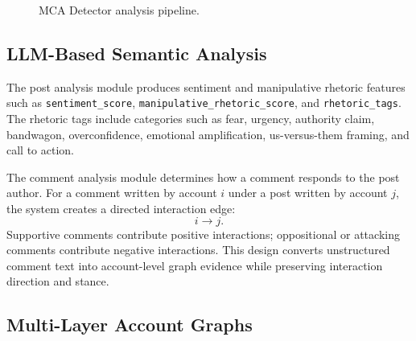 \documentclass[conference]{IEEEtran}
\begin{document}
\begin{figure}[htbp]
\centering
{}
\caption{MCA Detector analysis pipeline.}
\label{fig:pipeline}
\end{figure}

\subsection{LLM-Based Semantic Analysis}

The post analysis module produces sentiment and manipulative rhetoric features
such as \texttt{sentiment\_score}, \texttt{manipulative\_rhetoric\_score}, and
\texttt{rhetoric\_tags}. The rhetoric tags include categories such as fear,
urgency, authority claim, bandwagon, overconfidence, emotional amplification,
us-versus-them framing, and call to action.

The comment analysis module determines how a comment responds to the post
author. For a comment written by account $i$ under a post written by account
$j$, the system creates a directed interaction edge:
\begin{equation}
i \rightarrow j.
\end{equation}
Supportive comments contribute positive interactions; oppositional or attacking
comments contribute negative interactions. This design converts unstructured
comment text into account-level graph evidence while preserving interaction
direction and stance.

\subsection{Multi-Layer Account Graphs}
\end{document}
